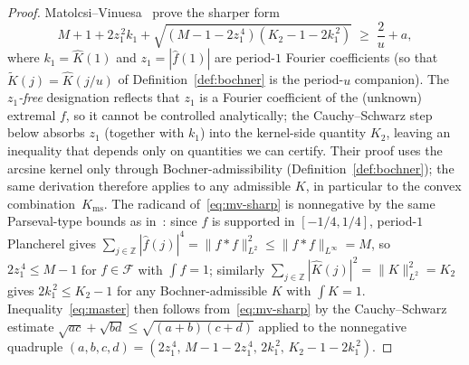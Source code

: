 \documentclass[11pt, letterpaper]{article}
\theoremstyle{paperplain}
\theoremstyle{paperdef}
\newcommand{\Z}{\mathbb{Z}}
\newcommand{\Linf}{L^\infty}
\newcommand{\Kms}{K_{\mathrm{ms}}}
\begin{document}
\begin{proof}
Matolcsi--Vinuesa~\cite[Lemma~3.3, Eq.~(10)]{MV10} prove the sharper
form
\begin{equation}\label{eq:mv-sharp}
  M + 1 + 2 z_1^{\,2} k_1
  + \sqrt{(M-1-2z_1^{\,4})(K_2-1-2k_1^{\,2})}
  \;\ge\;
  \frac{2}{u} + a,
\end{equation}
where $k_1=\widehat{K}(1)$ and $z_1=|\widehat{f}(1)|$ are
period-$1$ Fourier coefficients (so that $\widetilde{K}(j)
=\widehat{K}(j/u)$ of Definition~\ref{def:bochner} is the
period-$u$ companion).  The \emph{$z_1$-free} designation reflects
that $z_1$ is a Fourier coefficient of the (unknown) extremal $f$,
so it cannot be controlled analytically; the Cauchy--Schwarz step
below absorbs $z_1$ (together with $k_1$) into the kernel-side
quantity $K_2$, leaving an inequality that depends only on quantities
we can certify.  Their proof uses the arcsine kernel only through
Bochner-admissibility (Definition~\ref{def:bochner}); the same
derivation therefore applies to any admissible $K$, in particular
to the convex combination~$\Kms$.  The radicand of~\eqref{eq:mv-sharp}
is nonnegative by the same Parseval-type bounds as in~\cite[\S 3]{MV10}:
since $f$ is supported in $[-1/4,1/4]$, period-$1$ Plancherel gives
$\sum_{j\in\Z}|\widehat{f}(j)|^{4}=\|f*f\|_{L^{2}}^{2}\le\|f*f\|_{\Linf}=M$,
so $2z_1^{\,4}\le M-1$ for $f\in\mathcal{F}$ with $\int f=1$; similarly
$\sum_{j\in\Z}|\widehat{K}(j)|^{2}=\|K\|_{L^{2}}^{2}=K_2$ gives
$2k_1^{\,2}\le K_2-1$ for any Bochner-admissible $K$ with $\int K=1$.
Inequality~\eqref{eq:master} then follows from~\eqref{eq:mv-sharp}
by the Cauchy--Schwarz estimate
$\sqrt{ac}+\sqrt{bd}\le\sqrt{(a+b)(c+d)}$ applied to the nonnegative
quadruple
$(a,b,c,d)=(2z_1^{\,4},\,M-1-2z_1^{\,4},\,2k_1^{\,2},\,K_2-1-2k_1^{\,2})$.
\end{proof}
\end{document}
